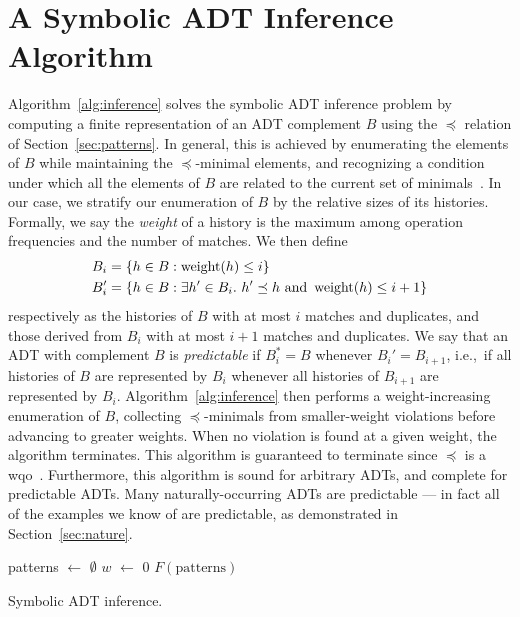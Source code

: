 \section{A Symbolic ADT Inference Algorithm}
\label{sec:algorithm}

Algorithm~\ref{alg:inference} solves the symbolic ADT inference problem by
computing a finite representation of an ADT complement $B$ using the $\preceq$
relation of Section~\ref{sec:patterns}. In general, this is achieved by
enumerating the elements of $B$ while maintaining the $\preceq$-minimal
elements, and recognizing a condition under which all the elements of $B$ are
related to the current set of minimals~\cite{conf/lics/AbdullaCJT96,
journals/tcs/FinkelS01}. In our case, we stratify our enumeration of $B$ by the
relative sizes of its histories. Formally, we say the \emph{weight} of a history
is the maximum among operation frequencies and the number of matches. We then
define
\begin{align*}
  & B_i = {\{{ h \in B : \operatorname{weight}(h) \le i }\}} \\
  & B_i' = {\{{ h \in B : \exists h' \in B_i.\ h' \preceq h \text{ and } \operatorname{weight}(h) \le i+1 }\}}
\end{align*}
respectively as the histories of $B$ with at most $i$ matches and duplicates,
and those derived from $B_i$ with at most $i+1$ matches and duplicates. We say
that an ADT with complement $B$ is \emph{predictable} if $B_i^* = B$ whenever
$B_i' = B_{i+1}$, i.e.,~if all histories of $B$ are represented by $B_i$ whenever
all histories of $B_{i+1}$ are represented by $B_i$. Algorithm~\ref{alg:inference}
then performs a weight-increasing enumeration of $B$, collecting
$\preceq$-minimals from smaller-weight violations before advancing to greater
weights. When no violation is found at a given weight, the algorithm terminates.
This algorithm is guaranteed to terminate since $\preceq$ is a
wqo~\cite{conf/lics/AbdullaCJT96, journals/tcs/FinkelS01}. Furthermore, this
algorithm is sound for arbitrary ADTs, and complete for predictable ADTs.
Many naturally-occurring ADTs are predictable — in fact all of the examples we
know of are predictable, as demonstrated in Section~\ref{sec:nature}.

\begin{algorithm}[t]
  \SetAlgoLined
  patterns $\gets$ $\emptyset$ \;
  $w$ $\gets$ $0$ \;
  \Return $F(\text{patterns})$
  \caption{Symbolic ADT inference.}
  \label{alg:inference}
\end{algorithm}

